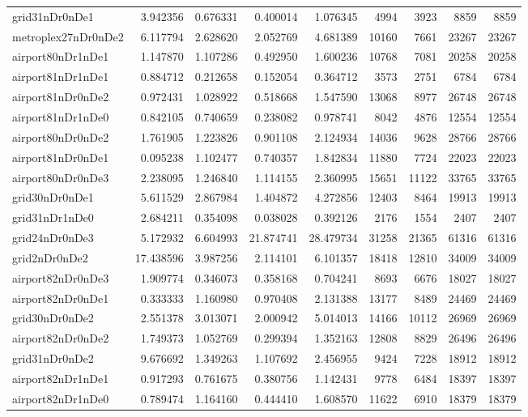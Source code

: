 \begin{longtable}{|l|r|r|r|r|r|r|r|r|}
grid31nDr0nDe1 & 3.942356 & 0.676331 & 0.400014 & 1.076345 & 4994 & 3923 & 8859 & 8859 \\
metroplex27nDr0nDe2 & 6.117794 & 2.628620 & 2.052769 & 4.681389 & 10160 & 7661 & 23267 & 23267 \\
airport80nDr1nDe1 & 1.147870 & 1.107286 & 0.492950 & 1.600236 & 10768 & 7081 & 20258 & 20258 \\
airport81nDr1nDe1 & 0.884712 & 0.212658 & 0.152054 & 0.364712 & 3573 & 2751 & 6784 & 6784 \\
airport81nDr0nDe2 & 0.972431 & 1.028922 & 0.518668 & 1.547590 & 13068 & 8977 & 26748 & 26748 \\
airport81nDr1nDe0 & 0.842105 & 0.740659 & 0.238082 & 0.978741 & 8042 & 4876 & 12554 & 12554 \\
airport80nDr0nDe2 & 1.761905 & 1.223826 & 0.901108 & 2.124934 & 14036 & 9628 & 28766 & 28766 \\
airport81nDr0nDe1 & 0.095238 & 1.102477 & 0.740357 & 1.842834 & 11880 & 7724 & 22023 & 22023 \\
airport80nDr0nDe3 & 2.238095 & 1.246840 & 1.114155 & 2.360995 & 15651 & 11122 & 33765 & 33765 \\
grid30nDr0nDe1 & 5.611529 & 2.867984 & 1.404872 & 4.272856 & 12403 & 8464 & 19913 & 19913 \\
grid31nDr1nDe0 & 2.684211 & 0.354098 & 0.038028 & 0.392126 & 2176 & 1554 & 2407 & 2407 \\
grid24nDr0nDe3 & 5.172932 & 6.604993 & 21.874741 & 28.479734 & 31258 & 21365 & 61316 & 61316 \\
grid2nDr0nDe2 & 17.438596 & 3.987256 & 2.114101 & 6.101357 & 18418 & 12810 & 34009 & 34009 \\
airport82nDr0nDe3 & 1.909774 & 0.346073 & 0.358168 & 0.704241 & 8693 & 6676 & 18027 & 18027 \\
airport82nDr0nDe1 & 0.333333 & 1.160980 & 0.970408 & 2.131388 & 13177 & 8489 & 24469 & 24469 \\
grid30nDr0nDe2 & 2.551378 & 3.013071 & 2.000942 & 5.014013 & 14166 & 10112 & 26969 & 26969 \\
airport82nDr0nDe2 & 1.749373 & 1.052769 & 0.299394 & 1.352163 & 12808 & 8829 & 26496 & 26496 \\
grid31nDr0nDe2 & 9.676692 & 1.349263 & 1.107692 & 2.456955 & 9424 & 7228 & 18912 & 18912 \\
airport82nDr1nDe1 & 0.917293 & 0.761675 & 0.380756 & 1.142431 & 9778 & 6484 & 18397 & 18397 \\
airport82nDr1nDe0 & 0.789474 & 1.164160 & 0.444410 & 1.608570 & 11622 & 6910 & 18379 & 18379 \\

\end{longtable}

